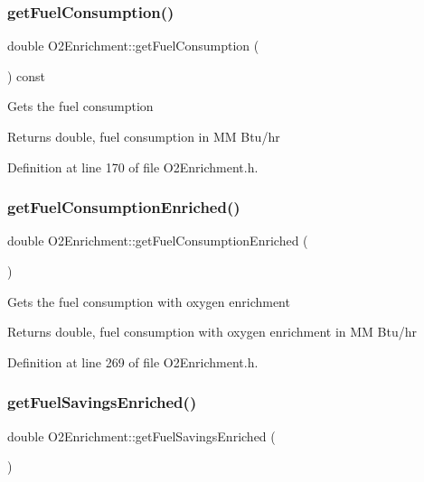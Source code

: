 \subsubsection{\texorpdfstring{get\+Fuel\+Consumption()}{getFuelConsumption()}}
{\footnotesize\ttfamily double O2\+Enrichment\+::get\+Fuel\+Consumption (\begin{DoxyParamCaption}{ }\end{DoxyParamCaption}) const\hspace{0.3cm}{\ttfamily [inline]}}

Gets the fuel consumption \begin{DoxyReturn}{Returns}
double, fuel consumption in MM Btu/hr 
\end{DoxyReturn}


Definition at line 170 of file O2\+Enrichment.\+h.

\mbox{\label{class_o2_enrichment_aaf0dae071145b439e995d90f838878a7}} 
\subsubsection{\texorpdfstring{get\+Fuel\+Consumption\+Enriched()}{getFuelConsumptionEnriched()}}
{\footnotesize\ttfamily double O2\+Enrichment\+::get\+Fuel\+Consumption\+Enriched (\begin{DoxyParamCaption}{ }\end{DoxyParamCaption})\hspace{0.3cm}{\ttfamily [inline]}}

Gets the fuel consumption with oxygen enrichment \begin{DoxyReturn}{Returns}
double, fuel consumption with oxygen enrichment in MM Btu/hr 
\end{DoxyReturn}


Definition at line 269 of file O2\+Enrichment.\+h.

\mbox{\label{class_o2_enrichment_a2aa9f8d3a02935931e705f82ae57c72f}} 
\subsubsection{\texorpdfstring{get\+Fuel\+Savings\+Enriched()}{getFuelSavingsEnriched()}}
{\footnotesize\ttfamily double O2\+Enrichment\+::get\+Fuel\+Savings\+Enriched (\begin{DoxyParamCaption}{ }\end{DoxyParamCaption})\hspace{0.3cm}{\ttfamily [inline]}}


